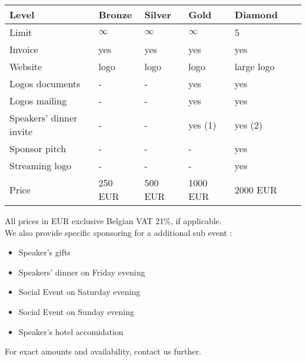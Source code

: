 \begin{longtable}{|p{40mm}|p{20mm}|p{20mm}|p{20mm}|p{20mm}|p{20mm}|p{20mm}|}
\hline
Level					&	Bronze				&	Silver				&	Gold				&	Diamond				\\
\hline
Limit					&	$\infty$			&	$\infty$			&	$\infty$			&	5					\\
\hline
Invoice					&	yes					&	yes					&	yes					&	yes					\\
\hline
Website					&	logo				&	logo				&	logo				&	large logo			\\
\hline
Logos documents			&	-					&	-					&	yes					&	yes					\\
\hline
Logos mailing			&	-					&	-					&	yes					&	yes					\\
\hline
Speakers' dinner invite &	-					&	-					&	yes (1)				&	yes (2)				\\
\hline
Sponsor pitch			&	-					&	-					&	-					&	yes					\\
\hline
Streaming logo			&	-					&	-					&	-					&	yes					\\
\hline
Price					&	250 EUR				&	500 EUR				&	1000 EUR			&	2000 EUR			\\
\hline
\end{longtable}
All prices in EUR exclusive Belgian VAT 21\%, if applicable.\\

We also provide specific sponsoring for a additional sub event :
\begin{itemize}
	\item
		Speaker's gifts
	\item
		Speakers' dinner on Friday evening
	\item
		Social Event on Saturday evening
	\item
		Social Event on Sunday evening
	\item
		Speaker's hotel accomidation
\end{itemize}
For exact amounts and availability, contact us further.
